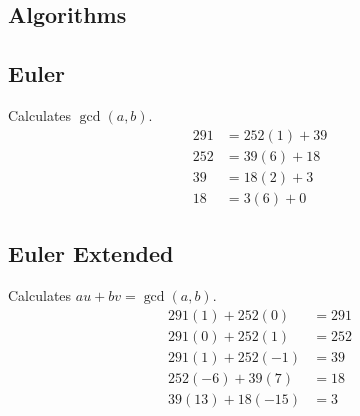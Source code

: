 \documentclass{article}
\begin{document}
\begin{multicols*}{2}
\section*{Algorithms}

\subsection*{Euler}
Calculates $\gcd(a, b)$.
\begin{align*}
    291 &= 252(1) + 39 \\
    252 &= 39(6)  + 18 \\
    39  &= 18(2)  + \boxed{3} \\
    18  &= 3(6)   + 0
\end{align*}

\subsection*{Euler Extended}
Calculates $au + bv = \gcd(a, b)$.
\begin{align*}
    291(1)  + 252(0) &= 291 \\
    291(0)  + 252(1) &= 252 \\
    291(1)  + 252(-1) &= 39 \\
    252(-6) + 39(7)   &= 18 \\
    39(13)  + 18(-15) &= 3 \\
\end{align*}

\end{multicols*}
\pagebreak
\end{document}

